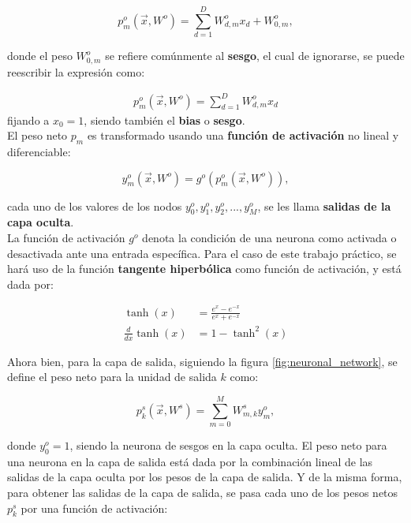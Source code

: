 \documentclass{article}
\begin{document}
\begin{equation}
    p_m^o\left(\vec{x},W^o\right) = \sum_{d=1}^{D}{W_{d,m}^{o} x_d + W_{0,m}^o} \label{eq:p_o_eq},
\end{equation}

\noindent
donde el peso $W_{0,m}^o$ se refiere comúnmente al \textbf{sesgo}, el cual de ignorarse, se puede reescribir la expresión como:

\begin{align*}
    p_m^o\left(\vec{x},W^o\right) = \sum_{d=1}^{D}{W_{d,m}^{o} x_d}
\end{align*}
\noindent
fijando a $x_0=1$, siendo también el \textbf{bias} o \textbf{sesgo}. \\

\noindent
El peso neto $p_m$ es transformado usando una \textbf{función de activación} no lineal y diferenciable:

\begin{equation}
    y_m^o\left(\vec{x},W^o\right) = g^{o}\left(p_m^o\left(\vec{x},W^o\right)\right) \label{eq:y_o_func},
\end{equation}

\noindent
cada uno de los valores de los nodos $\textbf{}y_0^{o}, y_1^{o}, y_2^{o},..., y_M^{o}$, se les llama \textbf{salidas de la capa oculta}. \\

La función de activación $g^o$ denota la condición de una neurona como activada o desactivada ante una entrada específica. Para el caso de este trabajo práctico, se hará uso de la función \textbf{tangente hiperbólica} como función de activación, y está dada por:

\begin{align}
    \tanh(x) &= \frac{e^x - e^{-x}}{e^x + e^{-x}} \label{eq:tanh_fun}\\
    \frac{d}{dx}\tanh(x) &= 1 - \tanh^2(x) \label{eq:tanh_deriv}
\end{align}

Ahora bien, para la capa de salida, siguiendo la figura \ref{fig:neuronal_network}, se define el peso neto para la unidad de salida $k$ como:

\begin{equation}
    p_k^s(\vec{x},W^s) = \sum_{m=0}^{M}{W_{m,k}^s y_m^o} \label{eq:p_s_eq},
\end{equation}

\noindent
donde $y_0^o=1$, siendo la neurona de sesgos en la capa oculta. El peso neto para una neurona en la capa de salida está dada por la combinación lineal de las salidas de la capa oculta por los pesos de la capa de salida. Y de la misma forma, para obtener las salidas de la capa de salida, se pasa cada uno de los pesos netos $p_k^s$ por una función de activación:
\end{document}
